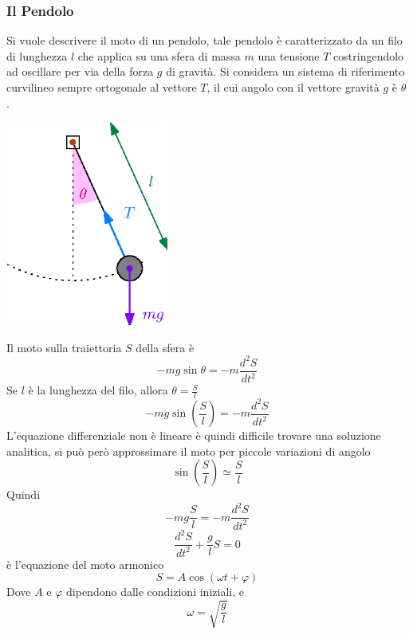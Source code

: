 \documentclass[10pt, letterpaper]{report}
\begin{document}
\subsubsection{Il Pendolo}
Si vuole descrivere il moto di un pendolo, tale pendolo è 
caratterizzato da un filo di lunghezza $l$ che applica su 
una sfera di massa $m$ una tensione $T$ costringendolo ad oscillare 
per via della forza $g$ di gravità. \acc Si considera un sistema 
di riferimento curvilineo sempre ortogonale al vettore $T$, il cui 
angolo con il vettore gravità $g$ è $\theta$.\begin{center}
    \includegraphics[width=0.4\textwidth ]{images/pendolo.eps}
\end{center}
Il moto sulla traiettoria $S$ della sfera è 
$$ -mg\sin\theta=-m\dfrac{d^2S}{dt^2}$$
Se $l$ è la lunghezza del filo, allora $\theta = \frac{S}{l}$
$$ -mg\sin(\frac{S}{l})=-m\dfrac{d^2S}{dt^2}$$
L'equazione differenziale non è lineare è quindi difficile trovare 
una soluzione analitica, si può però approssimare il moto 
per piccole variazioni di angolo 
$$ \sin(\frac{S}{l})\simeq \frac{S}{l}$$
Quindi 
$$ -mg\frac{S}{l}=-m\dfrac{d^2S}{dt^2}$$
$$ \dfrac{d^2S}{dt^2}+\frac{g}{l}S=0$$
è l'equazione del moto armonico 
$$S=A\cos(\omega t+\varphi) $$
Dove $A$ e $\varphi$ dipendono dalle condizioni iniziali, e 
$$ \omega = \sqrt{\frac{g}{l}}$$
\end{document}
